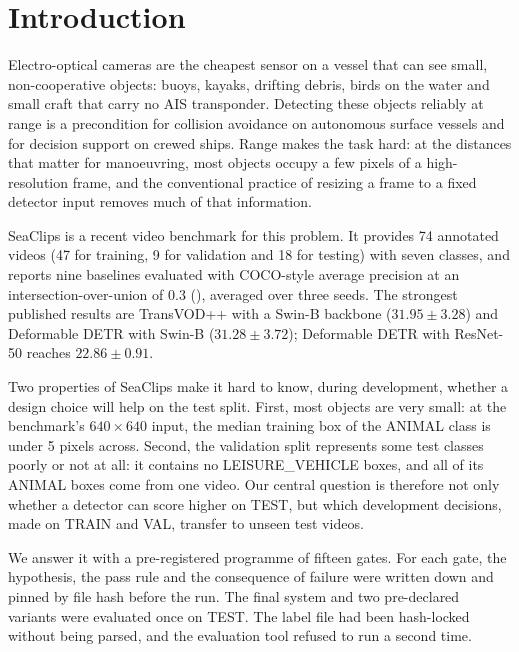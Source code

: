 \section{Introduction}\label{sec:intro}

Electro-optical cameras are the cheapest sensor on a vessel that can see small, non-cooperative objects: buoys, kayaks, drifting debris, birds on the water and small craft that carry no AIS transponder. Detecting these objects reliably at range is a precondition for collision avoidance on autonomous surface vessels and for decision support on crewed ships. Range makes the task hard: at the distances that matter for manoeuvring, most objects occupy a few pixels of a high-resolution frame, and the conventional practice of resizing a frame to a fixed detector input removes much of that information.

SeaClips \citep{denk2026seaclips} is a recent video benchmark for this problem. It provides 74 annotated videos (47 for training, 9 for validation and 18 for testing) with seven classes, and reports nine baselines evaluated with COCO-style average precision at an intersection-over-union of 0.3 (\mapthree{}), averaged over three seeds. The strongest published results are TransVOD++ with a Swin-B backbone ($31.95 \pm 3.28$) and Deformable DETR with Swin-B ($31.28 \pm 3.72$); Deformable DETR with ResNet-50 reaches $22.86 \pm 0.91$.

Two properties of SeaClips make it hard to know, during development, whether a design choice will help on the test split. First, most objects are very small: at the benchmark's $640 \times 640$ input, the median training box of the ANIMAL class is under 5 pixels across. Second, the validation split represents some test classes poorly or not at all: it contains no LEISURE\_VEHICLE boxes, and all of its ANIMAL boxes come from one video. Our central question is therefore not only whether a detector can score higher on TEST, but which development decisions, made on TRAIN and VAL, transfer to unseen test videos.

We answer it with a pre-registered programme of fifteen gates. For each gate, the hypothesis, the pass rule and the consequence of failure were written down and pinned by file hash before the run. The final system and two pre-declared variants were evaluated once on TEST. The label file had been hash-locked without being parsed, and the evaluation tool refused to run a second time.

